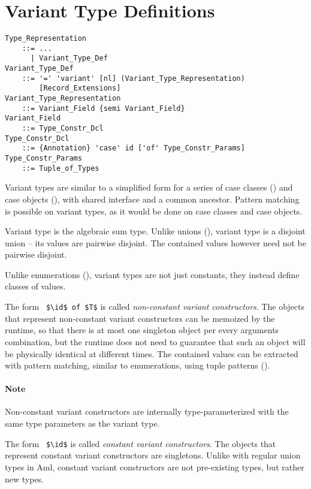 \section{Variant Type Definitions}
\label{sec:variant-types}

\grammar\begin{lstlisting}
Type_Representation
    ::= ...
      | Variant_Type_Def
Variant_Type_Def
    ::= '=' 'variant' [nl] (Variant_Type_Representation) 
        [Record_Extensions]
Variant_Type_Representation 
    ::= Variant_Field {semi Variant_Field}
Variant_Field
    ::= Type_Constr_Dcl
Type_Constr_Dcl
    ::= {Annotation} 'case' id ['of' Type_Constr_Params]
Type_Constr_Params
    ::= Tuple_of_Types
\end{lstlisting}

Variant types are similar to a simplified form for a series of case classes () and case objects (), with shared interface and a common ancestor. Pattern matching is possible on variant types, as it would be done on case classes and case objects. 

Variant type is the algebraic sum type. Unlike unions (), variant type is a disjoint union -- its values are pairwise disjoint. The contained values however need not be pairwise disjoint. 

Unlike enumerations (), variant types are not just constants, they instead define classes of values. 

The form ~\lstinline!$\id$ of $T$! is called {\em non-constant variant constructors}. The objects that represent non-constant variant constructors can be memoized by the runtime, so that there is at most one singleton object per every arguments combination, but the runtime does not need to guarantee that such an object will be physically identical at different times. The contained values can be extracted with pattern matching, similar to enumerations, using tuple patterns (). 

\paragraph{Note}
Non-constant variant constructors are internally type-parameterized with the same type parameters as the variant type. 

The form ~\lstinline!$\id$! is called {\em constant variant constructors}. The objects that represent constant variant constructors are singletons. Unlike with regular union types in Aml, constant variant constructors are not pre-existing types, but rather new types. 

